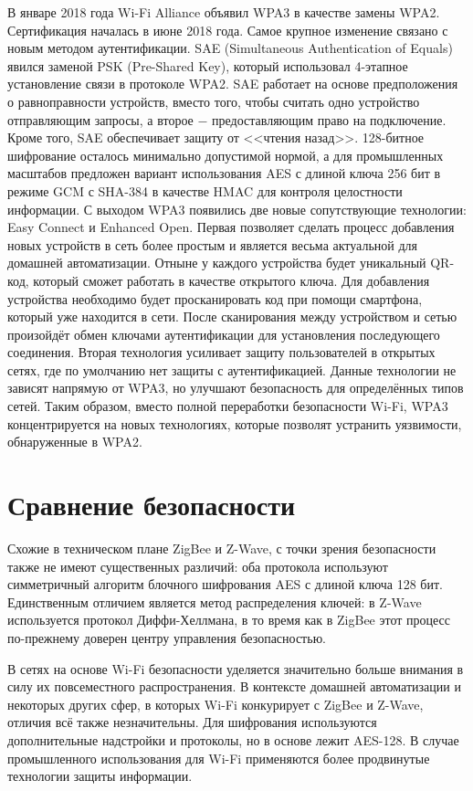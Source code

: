 	В январе 2018 года Wi-Fi Alliance объявил WPA3 в качестве замены WPA2. Сертификация началась в июне 
	2018 года. Самое крупное изменение связано с новым методом аутентификации. SAE (Simultaneous 
	Authentication of Equals) явился заменой PSK (Pre-Shared Key), который использовал 4-этапное 
	установление связи в протоколе WPA2. SAE работает на основе предположения о равноправности 
	устройств, вместо того, чтобы считать одно устройство отправляющим запросы, а второе $-$ предоставляющим 
	право на подключение.  Кроме того, SAE обеспечивает защиту от <<чтения назад>>. 128-битное шифрование
	осталось минимально допустимой нормой, а для промышленных масштабов предложен вариант использования
	AES с длиной ключа 256 бит в режиме GCM с SHA-384 в качестве HMAC для контроля целостности информации.
	С выходом WPA3 появились две новые сопутствующие технологии: Easy Connect  и Enhanced Open. Первая
	позволяет сделать процесс добавления новых устройств в сеть более простым и является весьма актуальной
	для домашней автоматизации. Отныне у каждого устройства будет уникальный QR-код, который сможет
	работать в качестве открытого ключа. Для добавления устройства необходимо будет просканировать код 
	при помощи смартфона, который уже находится в сети. После сканирования между устройством и сетью 
	произойдёт обмен ключами аутентификации для установления последующего соединения.
	Вторая технология усиливает защиту пользователей в открытых сетях, где по умолчанию нет защиты с
	аутентификацией.
	Данные технологии не зависят напрямую от WPA3, но улучшают безопасность для определённых типов сетей.
	Таким образом, вместо полной переработки безопасности Wi-Fi, WPA3 концентрируется на новых технологиях, 
	которые позволят устранить уязвимости, обнаруженные в WPA2.
	
	
	\section{Сравнение безопасности}
	
	Схожие в техническом плане ZigBee и Z-Wave, с точки зрения безопасности также не имеют
	существенных различий: оба протокола используют симметричный алгоритм блочного шифрования
	AES с длиной ключа 128 бит. Единственным отличием является метод распределения ключей: в Z-Wave
	используется протокол Диффи-Хеллмана, в то время как в ZigBee этот процесс по-прежнему доверен
	центру управления безопасностью.
	
	В сетях на основе Wi-Fi безопасности уделяется значительно больше внимания в силу их повсеместного
	распространения. В контексте домашней автоматизации и некоторых других сфер, в которых Wi-Fi
	конкурирует с ZigBee и Z-Wave, отличия всё также незначительны. Для шифрования используются
	дополнительные надстройки и протоколы, но в основе лежит AES-128. В случае промышленного
	использования для Wi-Fi применяются более продвинутые технологии защиты информации.
	